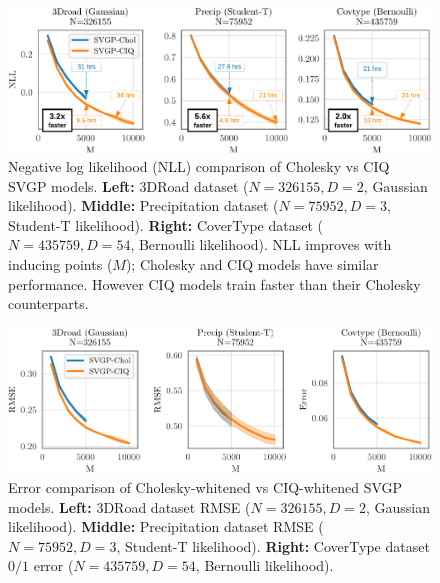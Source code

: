 \begin{figure}[t!]
  \centering
  \includegraphics[width=\linewidth]{figures/variational_nll.pdf}
  \caption[Negative log likelihood (NLL) comparison of Cholesky-whitened vs CIQ-whitened SVGP models.]{
    Negative log likelihood (NLL) comparison of Cholesky vs CIQ SVGP models.
    {\bf Left:} 3DRoad dataset ($N=326155, D=2$, Gaussian likelihood).
    {\bf Middle:} Precipitation dataset ($N=75952, D=3$, Student-T likelihood).
    {\bf Right:} CoverType dataset ($N=435759, D=54$, Bernoulli likelihood).
    NLL improves with inducing points ($M$); Cholesky and CIQ models have similar performance.
    However CIQ models train faster than their Cholesky counterparts.
  }
  \label{fig:variational_nll}
\end{figure}

\begin{figure}[t!]
  \centering
  \includegraphics[width=\linewidth]{figures/variational_error.pdf}
  \caption[Error comparison of Cholesky-whitened vs CIQ-whitened SVGP models.]{
    Error comparison of Cholesky-whitened vs CIQ-whitened SVGP models.
    {\bf Left:} 3DRoad dataset RMSE ($N=326155, D=2$, Gaussian likelihood).
    {\bf Middle:} Precipitation dataset RMSE ($N=75952, D=3$, Student-T likelihood).
    {\bf Right:} CoverType dataset $0/1$ error ($N=435759, D=54$, Bernoulli likelihood).
  }
  \label{fig:variational_error}
\end{figure}

